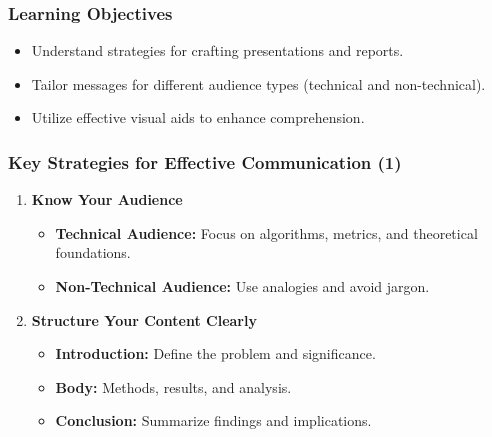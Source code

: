 \documentclass[aspectratio=169]{beamer}
\begin{document}
\begin{frame}[fragile]
    \frametitle{Learning Objectives}
    \begin{itemize}
        \item Understand strategies for crafting presentations and reports.
        \item Tailor messages for different audience types (technical and non-technical).
        \item Utilize effective visual aids to enhance comprehension.
    \end{itemize}
\end{frame}

\begin{frame}[fragile]
    \frametitle{Key Strategies for Effective Communication (1)}
    \begin{enumerate}
        \item \textbf{Know Your Audience}
        \begin{itemize}
            \item \textbf{Technical Audience:} Focus on algorithms, metrics, and theoretical foundations. 
            \item \textbf{Non-Technical Audience:} Use analogies and avoid jargon.
        \end{itemize}
        
        \item \textbf{Structure Your Content Clearly}
        \begin{itemize}
            \item \textbf{Introduction:} Define the problem and significance.
            \item \textbf{Body:} Methods, results, and analysis.
            \item \textbf{Conclusion:} Summarize findings and implications.
        \end{itemize}
    \end{enumerate}
\end{frame}
\end{document}
